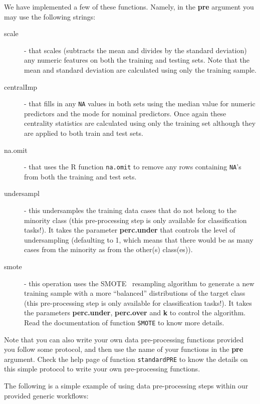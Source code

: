 \documentclass[10pt,a4paper]{article}\usepackage[]{graphicx}\usepackage[]{color}
\begin{document}
We have implemented a few of these functions. Namely, in the \textbf{pre} argument you may use the following strings:

\begin{description}
\item[scale] - that scales (subtracts the mean and divides by the standard
  deviation) any numeric features on both the training and testing
  sets. Note that the mean and standard deviation are calculated using
  only the training sample.

\item[centralImp] - that fills in any \texttt{NA} values in both sets using
  the median value for numeric predictors and the mode for nominal
  predictors. Once again these centrality statistics are calculated
  using only the training set although they are applied to both train
  and test sets.

\item[na.omit] - that uses the R function \texttt{na.omit} to remove
  any rows containing \texttt{NA}'s  from both the training and test sets.

\item[undersampl] - this undersamples the training data cases that do not
  belong to the minority class (this pre-processing step is only
  available for classification tasks!). It takes the parameter
  \textbf{perc.under} that controls the level of undersampling
  (defaulting to 1, which means that there would be as many cases from
  the minority as from the other(s) class(es)).

\item[smote] - this operation uses the SMOTE~\cite{CBOK02}
  resampling algorithm to  generate a new training sample with a more
  ``balanced'' distributions of the target class (this pre-processing step
  is only available for classification tasks!). It takes the parameters
  \textbf{perc.under},  \textbf{perc.over} and \textbf{k} to control the
  algorithm. Read the  documentation of function \texttt{SMOTE} to
  know more details. 
\end{description}

Note that you can also write your own data pre-processing functions
provided you follow some protocol, and then use the name of your
functions in the \textbf{pre} argument. Check the help page of
function \texttt{standardPRE} to know the details on this simple
protocol to write your own pre-processing functions.

The following is a simple example of using data pre-processing steps within our provided generic workflows:
\end{document}

